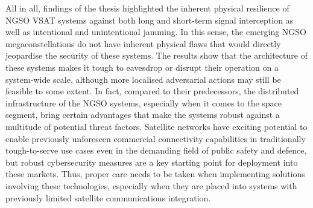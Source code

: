 \documentclass[english, 12pt, a4paper, elec, utf8, a-1b, online]{aaltothesis}
\begin{document}
All in all, findings of the thesis highlighted the inherent physical resilience of NGSO VSAT systems against both long and short-term signal interception as well as intentional and unintentional jamming.
In this sense, the emerging NGSO megaconstellations do not have inherent physical flaws that would directly jeopardise the security of these systems.
The results show that the architecture of these systems makes it tough to eavesdrop or disrupt their operation on a system-wide scale, although more localised adversarial actions may still be feasible to some extent.
In fact, compared to their predecessors, the distributed infrastructure of the NGSO systems, especially when it comes to the space segment, bring certain advantages that make the systems robust against a multitude of potential threat factors.
Satellite networks have exciting potential to enable previously unforeseen commercial connectivity capabilities in traditionally tough-to-serve use cases even in the demanding field of public safety and defence, but robust cybersecurity measures are a key starting point for deployment into these markets.
Thus, proper care needs to be taken when implementing solutions involving these technologies, especially when they are placed into systems with previously limited satellite communications integration.

\clearpage

\thesisbibliography




\clearpage

\thesisappendix
\end{document}
